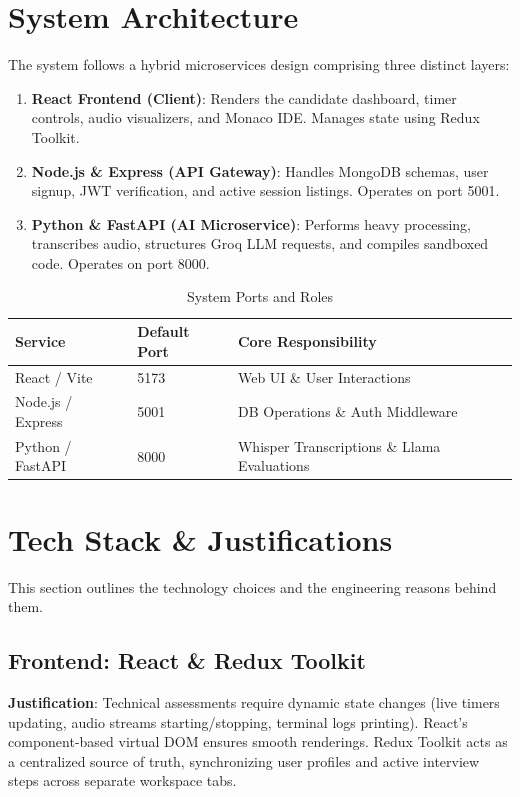 \documentclass[11pt,a4paper]{article}
\begin{document}
\section{System Architecture}
The system follows a hybrid microservices design comprising three distinct layers:
\begin{enumerate}
    \item \textbf{React Frontend (Client)}: Renders the candidate dashboard, timer controls, audio visualizers, and Monaco IDE. Manages state using Redux Toolkit.
    \item \textbf{Node.js \& Express (API Gateway)}: Handles MongoDB schemas, user signup, JWT verification, and active session listings. Operates on port 5001.
    \item \textbf{Python \& FastAPI (AI Microservice)}: Performs heavy processing, transcribes audio, structures Groq LLM requests, and compiles sandboxed code. Operates on port 8000.
\end{enumerate}

\begin{table}[htbp]
\centering
\caption{System Ports and Roles}
\begin{tabular}{lll}
\toprule
\textbf{Service} & \textbf{Default Port} & \textbf{Core Responsibility} \\
\midrule
React / Vite & 5173 & Web UI \& User Interactions \\
Node.js / Express & 5001 & DB Operations \& Auth Middleware \\
Python / FastAPI & 8000 & Whisper Transcriptions \& Llama Evaluations \\
\bottomrule
\end{tabular}
\end{table}

\section{Tech Stack \& Justifications}
This section outlines the technology choices and the engineering reasons behind them.

\subsection{Frontend: React \& Redux Toolkit}
\textbf{Justification}: Technical assessments require dynamic state changes (live timers updating, audio streams starting/stopping, terminal logs printing). React's component-based virtual DOM ensures smooth renderings. Redux Toolkit acts as a centralized source of truth, synchronizing user profiles and active interview steps across separate workspace tabs.
\end{document}
